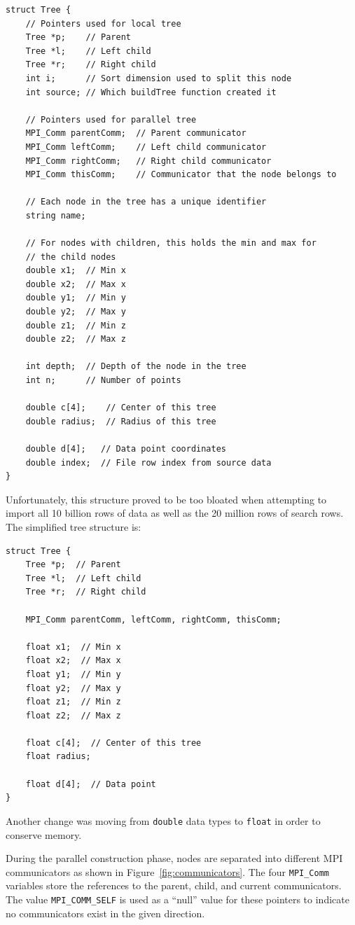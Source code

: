 \documentclass{article}
\begin{document}
\lstset{language=C++, keepspaces=true}
\begin{lstlisting}
struct Tree {
    // Pointers used for local tree
	Tree *p;    // Parent
	Tree *l;    // Left child
	Tree *r;    // Right child
	int i;      // Sort dimension used to split this node
	int source; // Which buildTree function created it

    // Pointers used for parallel tree
	MPI_Comm parentComm;  // Parent communicator
	MPI_Comm leftComm;    // Left child communicator
	MPI_Comm rightComm;   // Right child communicator
	MPI_Comm thisComm;    // Communicator that the node belongs to

    // Each node in the tree has a unique identifier
	string name;

    // For nodes with children, this holds the min and max for
    // the child nodes
	double x1;  // Min x
	double x2;  // Max x
	double y1;  // Min y
	double y2;  // Max y
	double z1;  // Min z
	double z2;  // Max z

	int depth;  // Depth of the node in the tree
	int n;      // Number of points

	double c[4];    // Center of this tree
	double radius;  // Radius of this tree

	double d[4];   // Data point coordinates
	double index;  // File row index from source data
}
\end{lstlisting}

Unfortunately, this structure proved to be too bloated when attempting to import all 10 billion rows of data as well as the 20 million rows of search rows. The simplified tree structure is:

\lstset{language=C++, keepspaces=true}
\begin{lstlisting}
struct Tree {
	Tree *p;  // Parent
	Tree *l;  // Left child
	Tree *r;  // Right child

	MPI_Comm parentComm, leftComm, rightComm, thisComm;

	float x1;  // Min x
	float x2;  // Max x
	float y1;  // Min y
	float y2;  // Max y
	float z1;  // Min z
	float z2;  // Max z

	float c[4];  // Center of this tree
	float radius;

	float d[4];  // Data point
}
\end{lstlisting}

Another change was moving from \texttt{double} data types to \texttt{float} in order to conserve memory.

During the parallel construction phase, nodes are separated into different MPI communicators as shown in Figure~\ref{fig:communicators}. The four \texttt{MPI\_Comm} variables store the references to the parent, child, and current communicators. The value \texttt{MPI\_COMM\_SELF} is used as a ``null'' value for these pointers to indicate no communicators exist in the given direction.
\end{document}
